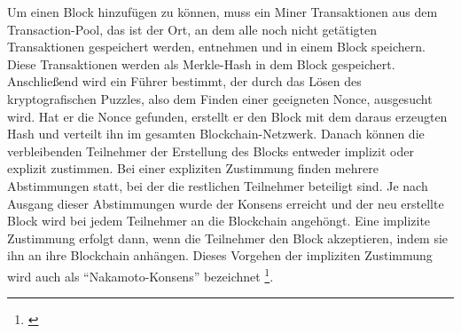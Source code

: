 Um einen Block hinzufügen zu können, muss ein Miner Transaktionen aus dem Transaction-Pool, das ist der Ort, an dem alle noch nicht getätigten Transaktionen gespeichert werden, entnehmen und in einem Block speichern. Diese Transaktionen werden als Merkle-Hash in dem Block gespeichert. Anschließend wird ein Führer bestimmt, der durch das Lösen des kryptografischen Puzzles, also dem Finden einer geeigneten Nonce, ausgesucht wird. Hat er die Nonce gefunden, erstellt er den Block mit dem daraus erzeugten Hash und verteilt ihn im gesamten Blockchain-Netzwerk. Danach können die verbleibenden Teilnehmer der Erstellung des Blocks entweder implizit oder explizit zustimmen. Bei einer expliziten Zustimmung finden mehrere Abstimmungen statt, bei der die restlichen Teilnehmer beteiligt sind. Je nach Ausgang dieser Abstimmungen wurde der Konsens erreicht und der neu erstellte Block wird bei jedem Teilnehmer an die Blockchain angehöngt. Eine implizite Zustimmung erfolgt dann, wenn die Teilnehmer den Block akzeptieren, indem sie ihn an ihre Blockchain anhängen. Dieses Vorgehen der impliziten Zustimmung wird auch als ``Nakamoto-Konsens'' bezeichnet \footnote{\parencite[vgl.][S. 5f]{Raikwar.2019}}.

